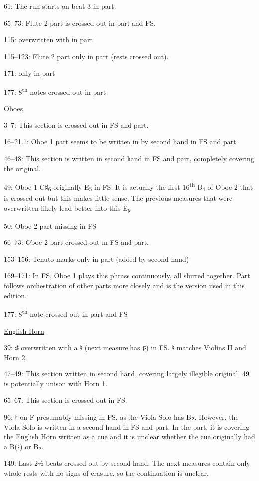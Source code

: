 \documentclass[twoside]{article}
\newcommand\dynmark[1]{\scalebox{0.9}{#1}{\kern1pt}}
\begin{document}
\begin{hangparas}{15pt}{1}
\begin{multicols}{2}
61: The run starts on beat 3 in part.

65--73: Flute 2 part is crossed out in part and FS.

115: \dynmark{\p} overwritten with \dynmark{\mf} in part

115--123: Flute 2 part only in part (rests crossed out).

171: \dynmark{\mf} only in part

177: 8\textsuperscript{th} notes crossed out in part

\underline{Oboes}

3--7: This section is crossed out in FS and part.

16--21.1: Oboe 1 part seems to be written in by second hand in FS and part

46--48: This section is written in second hand in FS and part, completely covering the original.

49: Oboe 1 C♯\textsubscript{6} originally E\textsubscript{5} in FS. It is actually the first 16\textsuperscript{th} B\textsubscript{4} of Oboe 2 that is crossed out but this makes little sense. The previous measures that were overwritten likely lead better into this E\textsubscript{5}.

50: Oboe 2 part missing in FS

66--73: Oboe 2 part crossed out in FS and part.

153--156: Tenuto marks only in part (added by second hand)

169--171: In FS, Oboe 1 plays this phrase continuously, all slurred together. Part follows orchestration of other parts more closely and is the version used in this edition.

177: 8\textsuperscript{th} note crossed out in part and FS

\underline{English Horn}

39: ♯ overwritten with a ♮ (next measure has ♯) in FS. ♮ matches Violins II and Horn 2.

47--49: This section written in second hand, covering largely illegible original. 49 is potentially unison with Horn 1.

65--67: This section is crossed out in FS.

96: ♮ on F presumably missing in FS, as the Viola Solo has B♭. However, the Viola Solo is written in a second hand in FS and part. In the part, it is covering the English Horn written as a cue and it is unclear whether the cue originally had a B(♮) or B♭.

149: Last 2½ beats crossed out by second hand. The next measures contain only whole rests with no signs of erasure, so the continuation is unclear.


\end{multicols}
\end{hangparas}
\end{document}
